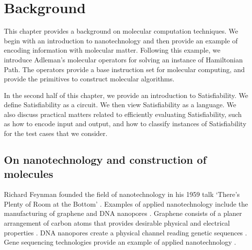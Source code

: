 \chapter{Background}


This chapter provides a background on molecular computation techniques.  We begin with an introduction to nanotechnology and then provide an example of encoding information with molecular matter.  Following this example, we introduce Adleman's molecular operators for solving an instance of {\sc Hamiltonian Path}.  The operators provide a base instruction set for molecular computing, and provide the primitives to construct molecular algorithms.

In the second half of this chapter, we provide an introduction to {\sc Satisfiability}.  We define {\sc Satisfiability} as a circuit.  We then view {\sc Satisfiability} as a language.  We also discuss practical matters related to efficiently evaluating {\sc Satisfiability}, such as how to encode input and output, and how to classify instances of {\sc Satisfiability} for the test cases that we consider.

\section{On nanotechnology and construction of molecules}

		
	Richard Feynman founded the field of nanotechnology in his 1959 talk `There's Plenty of Room at the Bottom' \cite{feynman1959}.  Examples of applied nanotechnology include the manufacturing of graphene \cite{Stankovich_Dikin_Dommett_Kohlhaas_Zimney_Stach_Piner_Nguyen_Ruoff_2006} and DNA nanopores \cite{dnaTransistorIBMpressrelease}. Graphene consists of a planer arrangement of carbon atoms that provides desirable physical and electrical properties \cite{Stankovich_Dikin_Dommett_Kohlhaas_Zimney_Stach_Piner_Nguyen_Ruoff_2006}. DNA nanopores create a physical channel reading genetic sequences \cite{Garaj2010}.  Gene sequencing technologies provide an example of applied nanotechnology \cite{Garaj2010, ionTorrent, oxfordNanopore}.  					
		
		
